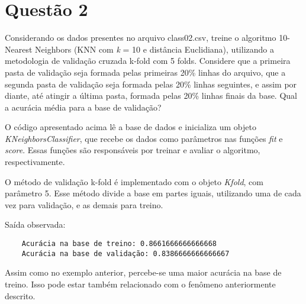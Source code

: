 \section{Questão 2}

Considerando os dados presentes no arquivo class02.csv, treine o algoritmo 10-Nearest Neighbors (KNN com \emph{k} = 10 e distância Euclidiana), utilizando a metodologia de validação cruzada k-fold com 5 folds. Considere que a primeira pasta de validação seja formada pelas primeiras 20\% linhas do arquivo, que a segunda pasta de validação seja formada pelas 20\% linhas seguintes, e assim por diante, até atingir a última pasta, formada pelas 20\% linhas finais da base. Qual a acurácia média para a base de validação?



O código apresentado acima lê a base de dados e inicializa um objeto \emph{KNeighborsClassifier}, que recebe os dados como parâmetros nas funções \emph{fit} e \emph{score}. Essas funções são responsáveis por treinar e avaliar o algoritmo, respectivamente.

O método de validação k-fold é implementado com o objeto \emph{Kfold}, com parâmetro 5. Esse método divide a base em partes iguais, utilizando uma de cada vez para validação, e as demais para treino.

Saída observada:

\begin{lstlisting}
    Acurácia na base de treino: 0.8661666666666668
    Acurácia na base de validação: 0.8386666666666667
\end{lstlisting}

Assim como no exemplo anterior, percebe-se uma maior acurácia na base de treino. Isso pode estar também relacionado com o fenômeno anteriormente descrito.